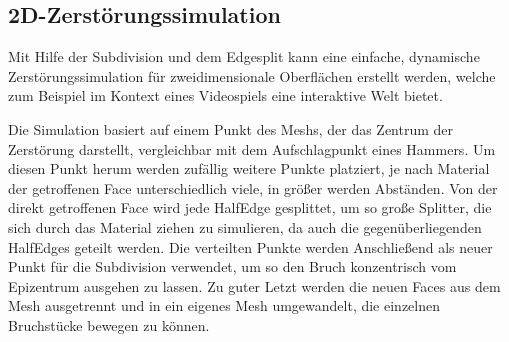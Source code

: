 \subsection {2D-Zerst\"orungssimulation}
Mit Hilfe der Subdivision und dem Edgesplit kann eine einfache, dynamische Zerst\"orungs\-simulation f\"ur zweidimensionale Oberfl\"achen erstellt werden, welche zum Beispiel im Kontext eines Videospiels eine interaktive Welt bietet. 

Die Simulation basiert auf einem Punkt des Meshs, der das Zentrum der Zerst\"orung darstellt, vergleichbar mit dem Aufschlagpunkt eines Hammers. Um diesen Punkt herum werden zuf\"allig weitere Punkte platziert, je nach Material der getroffenen Face unterschiedlich viele, in gr\"o{\ss}er werden Abst\"anden. Von der direkt getroffenen Face wird jede HalfEdge gesplittet, um so gro{\ss}e Splitter, die sich durch das Material ziehen zu simulieren, da auch die gegen\"uberliegenden HalfEdges geteilt werden. Die verteilten Punkte werden Anschlie{\ss}end als neuer Punkt f\"ur die Subdivision verwendet, um so den Bruch konzentrisch vom Epizentrum ausgehen zu lassen. Zu guter Letzt werden die neuen Faces aus dem Mesh ausgetrennt und in ein eigenes Mesh umgewandelt, die einzelnen Bruchst\"ucke bewegen zu k\"onnen.

